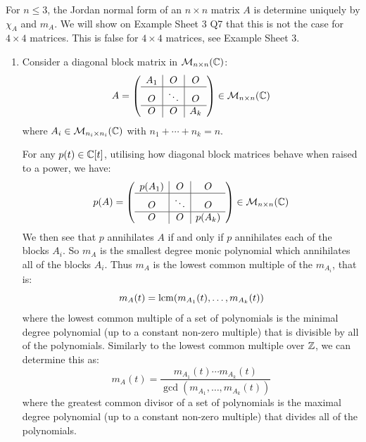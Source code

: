 \documentclass[../main.tex]{subfiles}
\begin{document}
\begin{remark}
  For $n \leq 3$, the Jordan normal form of an $n \times n$ matrix $A$ is determine uniquely by $\chi_A$  and $m_{A}$.
  We will show on Example Sheet 3 Q7 that this is not the case for $4 \times 4$ matrices.
  This is false for $4 \times 4$ matrices, see Example Sheet 3.
\end{remark}
\begin{remark}[Remarks]
  \begin{enumerate}
    \item Consider a diagonal block matrix in $\mathcal{M}_{n \times n}(\mathbb{C})$:
      \[
        A = \left(\begin{array}{c|c|c}
            A_1 & O & O \\ \hline
            O & \ddots & O \\ \hline
          O & O & A_k
        \end{array}\right) \in \mathcal{M}_{n \times n}(\mathbb{C})
      \]
      where $A_i \in \mathcal{M}_{n_i \times n_i}(\mathbb{C})$ with $n_1 + \cdots + n_k = n$.

      For any $p(t) \in \mathbb{C}[t]$, utilising how diagonal block matrices behave when raised to a power, we have:
      \[
        p(A) = \left(\begin{array}{c|c|c}
            p(A_1) & O & O \\ \hline
            O & \ddots & O \\ \hline
          O & O & p(A_k)
        \end{array}\right) \in \mathcal{M}_{n \times n}(\mathbb{C})
      \]
      We then see that $p$ annihilates $A$ if and only if $p$ annihilates each of the blocks $A_i$.
      So $m_{A}$ is the smallest degree monic polynomial which annihilates all of the blocks $A_i$.
      Thus $m_{A}$ is the lowest common multiple of the $m_{A_i}$, that is:
      \[
        m_{A}(t) = \operatorname{lcm}(m_{A_1}(t), \ldots, m_{A_k}(t))
      \]
      where the lowest common multiple of a set of polynomials is the minimal degree polynomial (up to a constant non-zero multiple) that is divisible by all of the polynomials.
      Similarly to the lowest common multiple over $\mathbb{Z}$, we can determine this as:
      \[
        m_{A}(t) = \frac{m_{A_1}(t) \cdots m_{A_k}(t)}{\gcd(m_{A_1}, \ldots, m_{A_k}(t))}
      \]
      where the greatest common divisor of a set of polynomials is the maximal degree polynomial (up to a constant non-zero multiple) that divides all of the polynomials.


\end{enumerate}
\end{remark}
\end{document}
